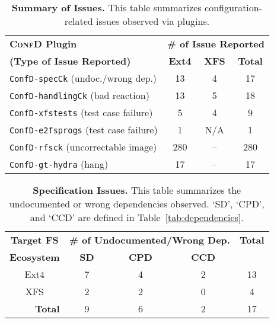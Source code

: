 \begin{table}[t]
	\small
	\begin{center}
		\begin{tabular}{ l   | c | c | c }
		 	\textbf{\textsc{ConfD} Plugin}     &\multicolumn{3}{c}{\textbf{\# of Issue Reported}}  \\
		 	  \cline{2-4}
   \textbf{(Type of  Issue Reported)}   & \textbf{Ext4}  &  \textbf{XFS}  & \textbf{Total} \\
          \hline
 \texttt{ConfD-specCk}    (undoc./wrong dep.)  &    13  & 4  &   17 \\
			\hline
\texttt{ConfD-handlingCk}  (bad reaction)   & 13  &  5   &  18\\
          \hline
 \texttt{ConfD-xfstests}   (test case failure)   &    5  & 4  &   9 \\
           \hline
 \texttt{ConfD-e2fsprogs}   (test case failure)  &    1  & N/A  &   1 \\
           \hline
 \texttt{ConfD-rfsck}   (uncorrectable image)    &    280  & --  &   280 \\
           \hline
 \texttt{ConfD-gt-hydra}  (hang)   &    17  & --  &   17 \\
  	\hline
		\end{tabular}
	\end{center}
	\caption{ {\bf Summary of Issues.} 
This table summarizes configuration-related issues observed via  \prj plugins. 
}
	\label{tab:result-summary}

\end{table}



\begin{table}[t]
	\small
	\begin{center}
		\begin{tabular}{ c | c | c | c | c }
		 	\textbf{Target FS}  &\multicolumn{3}{c|}{\textbf{\# of Undocumented/Wrong Dep.}} & \textbf{Total} \\
		 	  \cline{2-4}
 	\textbf{Ecosystem}   & \textbf{\space \space \space \space SD \space \space \space \space}  & \textbf{\space \space \space \space CPD \space \space \space \space}  & \textbf{CCD}  & \\
          \hline
   Ext4  &  7  &    4  & 2  &   13 \\
			\hline
XFS    & 2 &  2 &  0   & 4 \\
	\hline
  \multicolumn{1}{r|}{\textbf{Total}} & 9 & 6  &     2& 17 \\
  	\hline
		\end{tabular}
	\end{center}
	\caption{ {\bf Specification Issues.} 
This table summarizes the undocumented or wrong dependencies observed. `SD', `CPD', and `CCD' are   defined in Table~\ref{tab:dependencies}. 
}
	\label{tab:documentation-issue}
\end{table}



